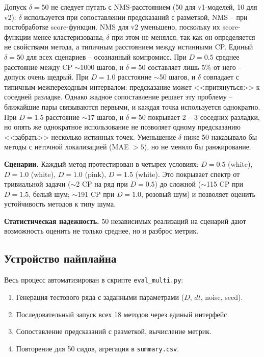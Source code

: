 \documentclass[12pt,a4paper]{article}
\begin{document}
Допуск $\delta = 50$ не следует путать с NMS-расстоянием (50 для v1-моделей, 10 для v2): $\delta$ используется при сопоставлении предсказаний с разметкой, NMS -- при постобработке score-функции. NMS для v2 уменьшено, поскольку их score-функции менее кластеризованы; $\delta$ при этом не менялся, так как он определяется не свойствами метода, а типичным расстоянием между истинными CP. Единый $\delta = 50$ для всех сценариев  -- осознанный компромисс. При $D = 0.5$ среднее расстояние между CP $\sim$1000 шагов, и $\delta = 50$ составляет лишь 5\% от него  -- допуск очень щедрый. При $D = 1.0$ расстояние $\sim$50 шагов, и $\delta$ совпадает с типичным межпереходным интервалом: предсказание может <<притянуться>> к соседней разладке. Однако жадное сопоставление решает эту проблему  -- ближайшие пары связываются первыми, и каждая точка используется однократно. При $D = 1.5$ расстояние $\sim$17 шагов, и $\delta = 50$ покрывает 2 -- 3 соседних разладки, но опять же однократное использование не позволяет одному предсказанию <<забрать>> несколько истинных точек. Уменьшение $\delta$ ниже 50 наказывало бы методы с неточной локализацией (MAE $> 5$), но не меняло бы ранжирование.

\textbf{Сценарии.} Каждый метод протестирован в четырех условиях: $D = 0.5$ (white), $D = 1.0$ (white), $D = 1.0$ (pink), $D = 1.5$ (white). Это покрывает спектр от тривиальной задачи ($\sim$2 CP на ряд при $D = 0.5$) до сложной ($\sim$115 CP при $D = 1.5$, белый шум; $\sim$191 CP при $D = 1.0$, розовый шум) и позволяет оценить устойчивость методов к типу шума.

\textbf{Статистическая надежность.} 50 независимых реализаций на сценарий дают возможность оценить не только среднее, но и разброс метрик.

\subsection{Устройство пайплайна}

Весь процесс автоматизирован в скрипте \texttt{eval\_multi.py}:
\begin{enumerate}
    \item Генерация тестового ряда с заданными параметрами ($D$, $dt$, noise, seed).
    \item Последовательный запуск всех 18 методов через единый интерфейс.
    \item Сопоставление предсказаний с разметкой, вычисление метрик.
    \item Повторение для 50 сидов, агрегация в \texttt{summary.csv}.
\end{enumerate}
\end{document}
